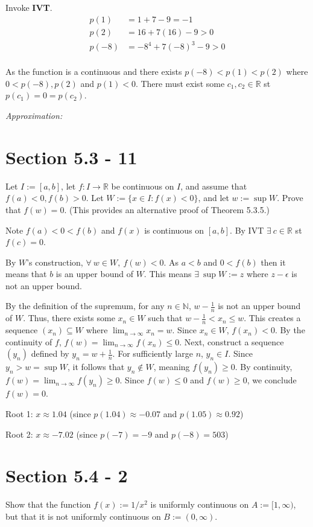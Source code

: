 Invoke \textbf{IVT}.
\[
\begin{align}
p(1)  & = 1 + 7 -9 = -1         \\
p(2)  & = 16 + 7(16) -9 > 0     \\
p(-8) & = -8^4 + 7(-8)^3 -9 > 0 \\
\end{align}
\]

As the function is a continuous and there exists $p(-8) < p(1) < p(2)$ where $0 <p(-8), p(2)$ and $p(1) < 0$. There must exist some $c_1, c_2 \in \mathbb{R}$  st $p(c_1) = 0 = p(c_2)$.

\textit{Approximation: }

\section{Section 5.3 - 11}
Let $I := [a, b]$, let $f : I \to \mathbb{R}$ be continuous on $I$, and assume that $f(a) < 0, f(b) > 0$. Let $W := \{x \in I : f(x) < 0\}$, and let $w := \sup W$. Prove that $f(w) = 0$. (This provides an alternative proof of Theorem 5.3.5.)

Note $f(a) < 0 < f(b)$ and $f(x)$ is continuous on $[a,b]$. By IVT $\exists~ c \in \mathbb{R}$ st $f(c)=0$. 

By $W$'s construction, $\forall~ w \in W, ~f(w) < 0$. As $a<b$ and $0 < f(b)$ then it means that $b$ is an upper bound of $W$. This means $\exists~ \sup W := z$ where $z-\epsilon$ is not an upper bound.

By the definition of the supremum, for any $n \in \mathbb{N}$, $w - \frac{1}{n}$ is not an upper bound of $W$. Thus, there exists some $x_n \in W$ such that $w - \frac{1}{n} < x_n \leq w$. 
This creates a sequence $(x_n) \subseteq W$ where $\lim_{n \to \infty} x_n = w$. Since $x_n \in W$, $f(x_n) < 0$. By the continuity of $f$, $f(w) = \lim_{n \to \infty} f(x_n) \leq 0$.
Next, construct a sequence $(y_n)$ defined by $y_n = w + \frac{1}{n}$. For sufficiently large $n$, $y_n \in I$. Since $y_n > w = \sup W$, it follows that $y_n \notin W$, meaning $f(y_n) \geq 0$. 
By continuity, $f(w) = \lim_{n \to \infty} f(y_n) \geq 0$.
Since $f(w) \leq 0$ and $f(w) \geq 0$, we conclude $f(w) = 0$.


Root 1: $x \approx 1.04$ (since $p(1.04) \approx -0.07$ and $p(1.05) \approx 0.92$)

Root 2: $x \approx -7.02$ (since $p(-7) = -9$ and $p(-8) = 503$)

\section{Section 5.4 - 2}
Show that the function $f(x) := 1/x^2$ is uniformly continuous on $A := [1, \infty)$, but that it is not uniformly continuous on $B := (0, \infty)$.

